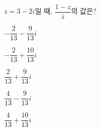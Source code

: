 $z=3-2i$일 때, $\dfrac{1-z}{\bar{z}}$의 값은? 
\begin{choicesii}{\rule[-3ex]{0pt}{8ex}$-\dfrac{2}{13}-\dfrac{9}{13}i$}{\rule[-3ex]{0pt}{8ex}$-\dfrac{2}{13}+\dfrac{10}{13}i$}{\rule[-3ex]{0pt}{8ex}$\dfrac{2}{13}+\dfrac{9}{13}i$}{\rule[-3ex]{0pt}{8ex}$\dfrac{4}{13}-\dfrac{9}{13}i$}{\rule[-3ex]{0pt}{8ex}$\dfrac{4}{13}+\dfrac{10}{13}i$}\end{choicesii}
